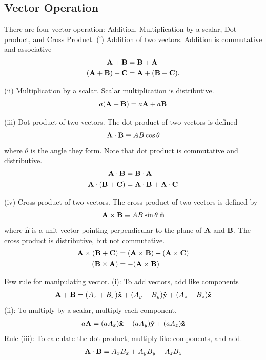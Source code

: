 \documentclass[../../../main.tex]{subfiles}
\begin{document}
\subsection{Vector Operation}
There are four vector operation: Addition,  Multiplication by a scalar, Dot product, and Cross Product.
(i) Addition of two vectors. Addition is commutative and associative
\begin{align*}
    \mathbf{A}+\mathbf{B}                          & =\mathbf{B}+\mathbf{A}                    \\
    (\mathbf{A }+ \mathbf{B}) +\mathbf{ C} & = \mathbf{A }+ (\mathbf{B} + \mathbf{C}).
\end{align*}

(ii) Multiplication by a scalar. Scalar multiplication is distributive.
\begin{align*}
    a(\mathbf{A} + \mathbf{\mathbf{B}}) = a\mathbf{A} + a\mathbf{B}
\end{align*}

(iii) Dot product of two vectors. The dot product of two vectors is defined
\begin{align*}
    \mathbf{A} \cdot \mathbf{B} \equiv AB \cos \theta
\end{align*}
where $\theta$ is the angle they form. Note that dot product is commutative and distributive.
\begin{align*}
    \mathbf{A} \cdot \mathbf{B}        & = \mathbf{B} \cdot \mathbf{A}               \\
    \mathbf{A} \cdot (\mathbf{B} + \mathbf{C}) & = \mathbf{A} \cdot \mathbf{B} + \mathbf{A} \cdot \mathbf{C}
\end{align*}

(iv) Cross product of two vectors. The cross product of two vectors is defined by
\begin{align*}
    \mathbf{A} \times \mathbf{B} \equiv AB \sin \theta\;\mathbf{ \hat{n}}
\end{align*}
where $\mathbf{\hat{n}}$ is a unit vector pointing perpendicular to the plane of $\mathbf{A}$ and $\mathbf{B}$.  The cross product is distributive, but not commutative.
\begin{align*}
    \mathbf{A} \times (\mathbf{B} + \mathbf{C}) & = (\mathbf{A} \times \mathbf{B}) + (\mathbf{A} \times \mathbf{C}) \\
    (\mathbf{B} \times \mathbf{A})      & = -(\mathbf{A} \times \mathbf{B})
\end{align*}

Few rule for manipulating vector. (i): To add vectors, add like components
\begin{align*}
    \mathbf{A} + \mathbf{B}=(A_x + B_x )\mathbf{\hat{x}} + (A_y + B_y )\mathbf{\hat{y}} + (A_z + B_z )\mathbf{\hat{z}}
\end{align*}
(ii): To multiply by a scalar, multiply each component.
\begin{align*}
    a\mathbf{A} = (a A_x )\mathbf{\hat{x}}+ (a A_y )\mathbf{\hat{y}} + (a A_z )\mathbf{\hat{z}}
\end{align*}
Rule (iii): To calculate the dot product, multiply like components, and add.
\begin{align*}
    \mathbf{A} \cdot \mathbf{B} & = A_xB_x +A_yB_y+ A_zB_z \\
\end{align*}
\end{document}
